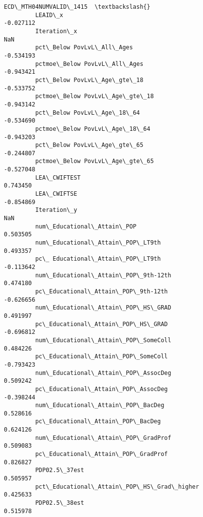 \documentclass[11pt]{article}
\begin{document}
\begin{Verbatim}[commandchars=\\\{\}]
                                                    ECD\_MTH04NUMVALID\_1415  \textbackslash{}
         LEAID\_x                                                 -0.027112   
         Iteration\_x                                                   NaN   
         pct\_Below PovLvL\_All\_Ages                               -0.534193   
         pctmoe\_Below PovLvL\_All\_Ages                            -0.943421   
         pct\_Below PovLvL\_Age\_gte\_18                             -0.533752   
         pctmoe\_Below PovLvL\_Age\_gte\_18                          -0.943142   
         pct\_Below PovLvL\_Age\_18\_64                              -0.534690   
         pctmoe\_Below PovLvL\_Age\_18\_64                           -0.943203   
         pct\_Below PovLvL\_Age\_gte\_65                             -0.244807   
         pctmoe\_Below PovLvL\_Age\_gte\_65                          -0.527048   
         LEA\_CWIFTEST                                             0.743450   
         LEA\_CWIFTSE                                             -0.854869   
         Iteration\_y                                                   NaN   
         num\_Educational\_Attain\_POP                               0.503505   
         num\_Educational\_Attain\_POP\_LT9th                         0.493357   
         pc\_ Educational\_Attain\_POP\_LT9th                        -0.113642   
         num\_Educational\_Attain\_POP\_9th-12th                      0.474180   
         pc\_Educational\_Attain\_POP\_9th-12th                      -0.626656   
         num\_Educational\_Attain\_POP\_HS\_GRAD                       0.491997   
         pc\_Educational\_Attain\_POP\_HS\_GRAD                       -0.696812   
         num\_Educational\_Attain\_POP\_SomeColl                      0.484226   
         pc\_Educational\_Attain\_POP\_SomeColl                      -0.793423   
         num\_Educational\_Attain\_POP\_AssocDeg                      0.509242   
         pc\_Educational\_Attain\_POP\_AssocDeg                      -0.398244   
         num\_Educational\_Attain\_POP\_BacDeg                        0.528616   
         pc\_Educational\_Attain\_POP\_BacDeg                         0.624126   
         num\_Educational\_Attain\_POP\_GradProf                      0.509083   
         pc\_Educational\_Attain\_POP\_GradProf                       0.826827   
         PDP02.5\_37est                                            0.505957   
         pct\_Educational\_Attain\_POP\_HS\_Grad\_higher                0.425633   
         PDP02.5\_38est                                            0.515978   

\end{Verbatim}
\end{document}
